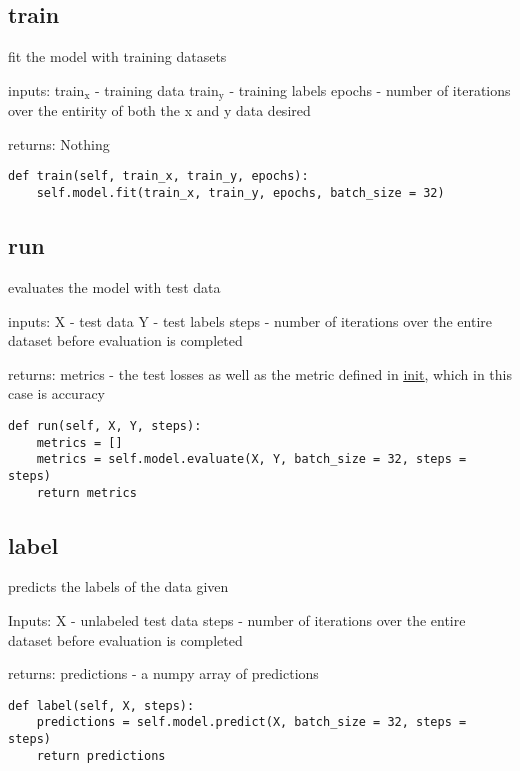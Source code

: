 \documentclass[11pt]{article}
\begin{document}
\subsection{train}
\label{sec:org6ee7a16}

fit the model with training datasets

inputs:
train\(_{\text{x}}\) - training data
train\(_{\text{y}}\) - training labels
epochs - number of iterations over the entirity of both the x and y data desired

returns:
Nothing

\begin{verbatim}
def train(self, train_x, train_y, epochs):
    self.model.fit(train_x, train_y, epochs, batch_size = 32)
\end{verbatim}

\subsection{run}
\label{sec:orge10a0b9}


evaluates the model with test data

inputs:
X - test data
Y - test labels
steps - number of iterations over the entire dataset before evaluation is completed

returns:
metrics - the test losses as well as the metric defined in \uline{\uline{init}}, which in this case is accuracy

\begin{verbatim}
def run(self, X, Y, steps):
    metrics = []
    metrics = self.model.evaluate(X, Y, batch_size = 32, steps = steps)
    return metrics
\end{verbatim}


\subsection{label}
\label{sec:org79da9c2}

predicts the labels of the data given

Inputs:
X - unlabeled test data
steps - number of iterations over the entire dataset before evaluation is completed

returns:
predictions - a numpy array of predictions

\begin{verbatim}
def label(self, X, steps):
    predictions = self.model.predict(X, batch_size = 32, steps = steps)
    return predictions
\end{verbatim}
\end{document}
